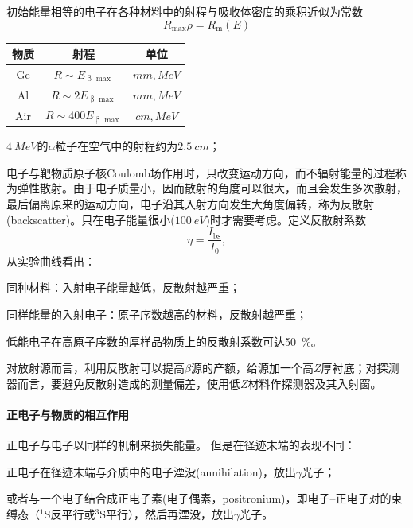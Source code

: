 初始能量相等的电子在各种材料中的射程与吸收体密度的乘积近似为常数
\begin{equation}\label{eq:nrd-electron-mass-range}
	R_{\max} \rho = R_{\mathrm{m}}(E)
\end{equation}
\begin{notecaptionblock}
	\begin{tabular}{ccc}
		\toprule
		物质&射程&单位\\
		\midrule
		Ge&$R \sim E_{\upbeta\max{}}$&$\unit{mm},\unit{MeV}$\\
		Al&$R \sim 2E_{\upbeta\max{}}$&$\unit{mm},\unit{MeV}$\\
		Air&$R \sim 400E_{\upbeta\max{}}$&$\unit{cm},\unit{MeV}$\\
		\bottomrule
	\end{tabular}
\end{notecaptionblock}
$\qty{4}{MeV}$的$\alpha$粒子在空气中的射程约为$\qty{2.5}{cm}$；

电子与靶物质原子核Coulomb场作用时，只改变运动方向，而不辐射能量的过程称为弹性散射。由于电子质量小，因而散射的角度可以很大，而且会发生多次散射，最后偏离原来的运动方向，电子沿其入射方向发生大角度偏转，称为反散射(backscatter)。只在电子能量很小($\qty{100}{eV}$)时才需要考虑。定义反散射系数
\begin{equation}\label{eq:nrd-backscatter-coefficient}
	\eta = \frac{I_{\mathrm{bs}}}{I_0},
\end{equation}
从实验曲线看出：
\begin{compactenum}
	\item 同种材料：入射电子能量越低，反散射越严重；
	\item 同样能量的入射电子：原子序数越高的材料，反散射越严重；
	\item 低能电子在高原子序数的厚样品物质上的反散射系数可达\qty{50}{\percent}。
\end{compactenum}
对放射源而言，利用反散射可以提高$\beta$源的产额，给源加一个高$Z$厚衬底；对探测器而言，要避免反散射造成的测量偏差，使用低$Z$材料作探测器及其入射窗。
\paragraph{正电子与物质的相互作用}
正电子与电子以同样的机制来损失能量。
但是在径迹末端的表现不同：
\begin{compactitem}
	\item 正电子在径迹末端与介质中的电子湮没(annihilation)，放出$\gamma$光子；
	\item 或者与一个电子结合成正电子素(电子偶素，positronium)，即电子--正电子对的束缚态（$^1$S反平行或$^3$S平行），然后再湮没，放出$\gamma$光子。
\end{compactitem}

